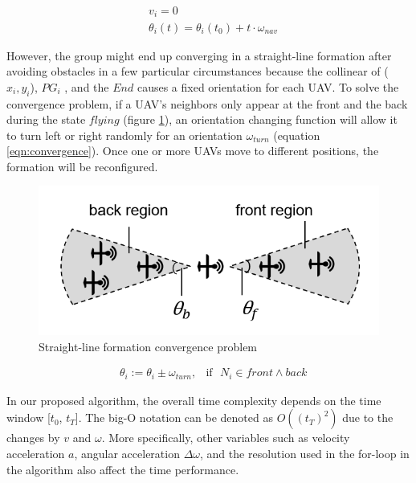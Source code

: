 \begin{equation}
\begin{aligned}
& v_{i} = 0 \\
& \theta_{i}(t) = \theta_{i}(t_{0}) + t \cdot \omega_{nav}
\end{aligned}
\end{equation}

However, the group might end up converging in a straight-line formation after avoiding obstacles in a few particular circumstances because the collinear of ($x_{i}, y_{i}$), $PG_{i}$ , and the $End$ causes a fixed orientation for each UAV. To solve the convergence problem, if a UAV's neighbors only appear at the front and the back during the state $flying$ (figure \ref{fig:convergence}), an orientation changing function will allow it to turn left or right randomly for an orientation $\omega_{turn}$ (equation \ref{eqn:convergence}). Once one or more UAVs move to different positions, the formation will be reconfigured.

\begin{figure}[H]
    \centering
    \includegraphics[scale=0.8]{figures/line-convergence.png}
    \caption{Straight-line formation convergence problem}
    \label{fig:convergence}
\end{figure}

\begin{equation}
\begin{aligned}
& \theta_{i} := \theta_{i} \pm \omega_{turn}, &\mbox{if} \mbox{ }  N_{i} \in front \land back
\label{eqn:convergence}
\end{aligned}
\end{equation}




In our proposed algorithm, the overall time complexity depends on the time window [$t_{0}$, $t_{T}$]. The big-O notation can be denoted as $O((t_{T})^2)$ due to the changes by $v$ and $\omega$. More specifically, other variables such as velocity acceleration $a$, angular acceleration $\Delta\omega$, and the resolution used in the for-loop in the algorithm also affect the time performance.







